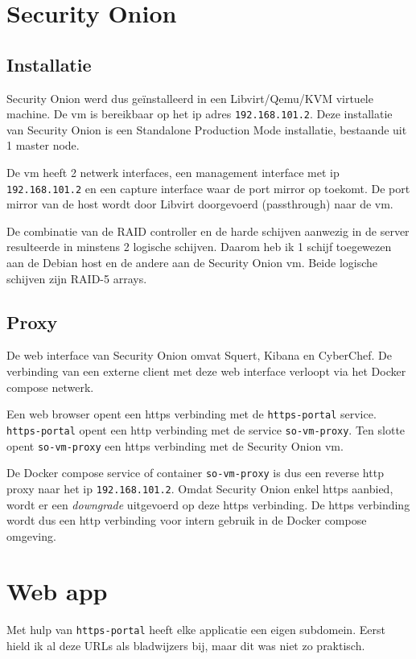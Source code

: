 \documentclass[a4paper,12pt]{report}
\begin{document}
\section{Security Onion}
\subsection{Installatie}
Security Onion werd dus geïnstalleerd in een Libvirt/Qemu/KVM virtuele machine.
De vm is bereikbaar op het ip adres \lstinline|192.168.101.2|.
Deze installatie van Security Onion is een Standalone Production Mode installatie, bestaande uit 1 master node.

De vm heeft 2 netwerk interfaces, een management interface met ip \lstinline|192.168.101.2| en een capture interface waar de port mirror op toekomt.
De port mirror van de host wordt door Libvirt doorgevoerd (passthrough) naar de vm.

De combinatie van de RAID controller en de harde schijven aanwezig in de server resulteerde in minstens 2 logische schijven.
Daarom heb ik 1 schijf toegewezen aan de Debian host en de andere aan de Security Onion vm.
Beide logische schijven zijn RAID-5 arrays.

\subsection{Proxy}
De web interface van Security Onion omvat Squert, Kibana en CyberChef.
De verbinding van een externe client met deze web interface verloopt via het Docker compose netwerk.

Een web browser opent een https verbinding met de \lstinline|https-portal| service.
\lstinline|https-portal| opent een http verbinding met de service \lstinline|so-vm-proxy|.
Ten slotte opent \lstinline|so-vm-proxy| een https verbinding met de Security Onion vm.

De Docker compose service of container \lstinline|so-vm-proxy| is dus een reverse http proxy naar het ip \lstinline|192.168.101.2|.
Omdat Security Onion enkel https aanbied, wordt er een \emph{downgrade} uitgevoerd op deze https verbinding.
De https verbinding wordt dus een http verbinding voor intern gebruik in de Docker compose omgeving.

\section{Web app}
Met hulp van \lstinline|https-portal| heeft elke applicatie een eigen subdomein.
Eerst hield ik al deze URLs als bladwijzers bij, maar dit was niet zo praktisch.
\end{document}
